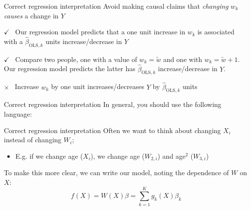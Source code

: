 \documentclass[aspectratio=169,t,11pt,table]{beamer}
\begin{document}
\begin{frame}{Correct regression interpretation}
  Avoid making causal claims that \emph{changing} $w_k$ \emph{causes} a change in $Y$
  
  \begin{tcolorbox}[boxrule = 0pt, frame hidden, sharp corners, enhanced, borderline west = {4pt}{0pt}{green}, interior hidden]
    {\color{green}\Large $\checkmark$\ } Our regression model predicts that a one unit increase in $w_k$ is associated with a $\hat{\beta}_{\text{OLS},k}$ units increase/decrease in $Y$
  \end{tcolorbox}

  \begin{tcolorbox}[boxrule = 0pt, frame hidden, sharp corners, enhanced, borderline west = {4pt}{0pt}{green}, interior hidden]
    {\color{green}\Large $\checkmark$\ } Compare two people, one with a value of $w_k = \tilde{w}$ and one with $w_k = \tilde{w} + 1$. 
    Our regression model predicts the latter has $\hat{\beta}_{\text{OLS},k}$ increase/decrease in $Y$.
  \end{tcolorbox}

  \begin{tcolorbox}[boxrule = 0pt, frame hidden, sharp corners, enhanced, borderline west = {4pt}{0pt}{red}, interior hidden]
   {\color{red}\Large $\times$\ } Increase $w_k$ by one unit increases/decreases $Y$ by $\hat{\beta}_{\text{OLS},k}$ units
  \end{tcolorbox}
\end{frame}

\begin{frame}{Correct regression interpretation}
  In general, you should use the following language:

\end{frame}



\begin{frame}{Correct regression interpretation}
  Often we want to think about changing $X_i$ instead of changing $W_i$;
  \begin{itemize}
    \item E.g. if we change age ($X_i$), we change age ($W_{2,i}$) and age$^2$ ($W_{3,i}$)
  \end{itemize}

  \bigskip
  To make this more clear, we can write our model, noting the dependence of $W$ on $X$:
  $$
    f(X) = W(X) \beta = \sum_{k=1}^K g_{k}(X) \beta_k
  $$
\end{frame}
\end{document}
